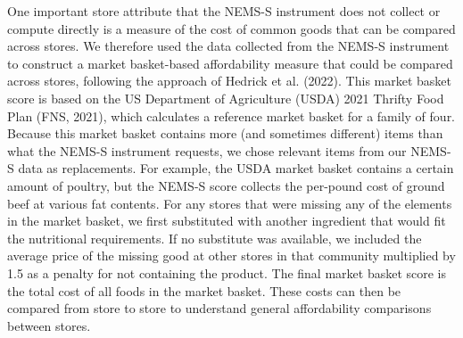 \documentclass[
  letterpaper,
  DIV=11,
  numbers=noendperiod]{scrreport}
\begin{document}
One important store attribute that the NEMS-S instrument does not
collect or compute directly is a measure of the cost of common goods
that can be compared across stores. We therefore used the data collected
from the NEMS-S instrument to construct a market basket-based
affordability measure that could be compared across stores, following
the approach of Hedrick et al. (2022). This market basket score is based
on the US Department of Agriculture (USDA) 2021 Thrifty Food Plan (FNS,
2021), which calculates a reference market basket for a family of four.
Because this market basket contains more (and sometimes different) items
than what the NEMS-S instrument requests, we chose relevant items from
our NEMS-S data as replacements. For example, the USDA market basket
contains a certain amount of poultry, but the NEMS-S score collects the
per-pound cost of ground beef at various fat contents. For any stores
that were missing any of the elements in the market basket, we first
substituted with another ingredient that would fit the nutritional
requirements. If no substitute was available, we included the average
price of the missing good at other stores in that community multiplied
by 1.5 as a penalty for not containing the product. The final market
basket score is the total cost of all foods in the market basket. These
costs can then be compared from store to store to understand general
affordability comparisons between stores.
\end{document}
